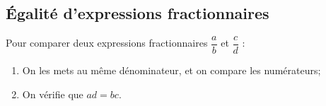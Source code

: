 \documentclass{poly}
\begin{document}
\subsection{Égalité d'expressions fractionnaires}
\begin{remark}
Pour comparer deux expressions fractionnaires $\dfrac{a}{b}$ et $\dfrac{c}{d}$ :
\begin{enumerate}
\item On les mets au même dénominateur, et on compare les numérateurs;
\item On vérifie que $ad = bc$. 
\end{enumerate}
\end{remark}
\end{document}
